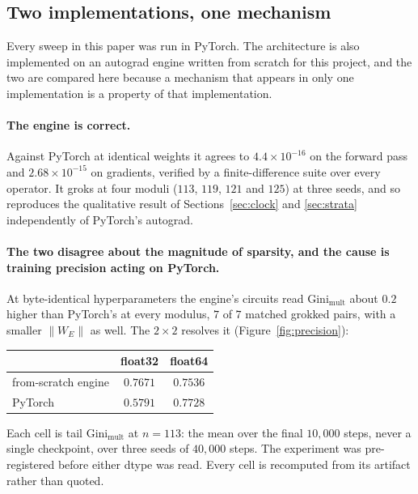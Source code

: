 \subsection{Two implementations, one mechanism}
\label{sec:impl}

Every sweep in this paper was run in PyTorch. The architecture is also implemented on an
autograd engine written from scratch for this project, and the two are compared here because
a mechanism that appears in only one implementation is a property of that implementation.

\paragraph{The engine is correct.} Against PyTorch at identical weights it agrees to
$4.4 \times 10^{-16}$ on the forward pass and $2.68 \times 10^{-15}$ on gradients, verified by
a finite-difference suite over every operator. It groks at four moduli ($113$, $119$, $121$
and $125$) at three seeds, and so reproduces the qualitative result of
Sections~\ref{sec:clock} and \ref{sec:strata} independently of PyTorch's autograd.

\paragraph{The two disagree about the magnitude of sparsity, and the cause is training
precision acting on PyTorch.} At byte-identical hyperparameters the engine's circuits read
$\mathrm{Gini}_{\text{mult}}$ about $0.2$ higher than PyTorch's at every modulus, $7$ of $7$
matched grokked pairs, with a smaller $\lVert W_{E} \rVert$ as well. The $2 \times 2$ resolves
it (Figure~\ref{fig:precision}):

\begin{center}
\begin{tabular}{lcc}
  \toprule
  & float32 & float64 \\
  \midrule
  from-scratch engine & $0.7671$ & $0.7536$ \\
  PyTorch & $\mathbf{0.5791}$ & $\mathbf{0.7728}$ \\
  \bottomrule
\end{tabular}
\end{center}

Each cell is tail $\mathrm{Gini}_{\text{mult}}$ at $n = 113$: the mean over the final
$10{,}000$ steps, never a single checkpoint, over three seeds of $40{,}000$ steps. The experiment
was pre-registered before either dtype was read. Every cell is recomputed from its artifact
rather than quoted.

